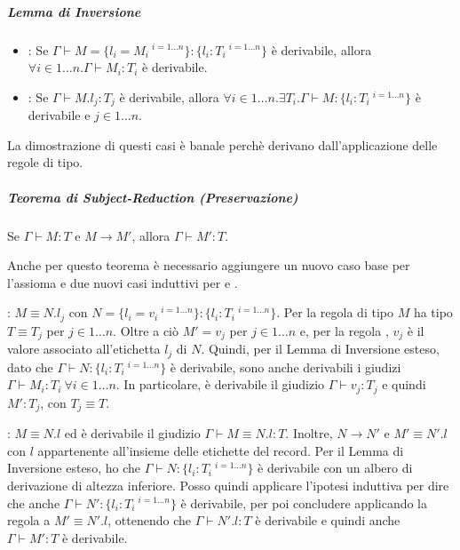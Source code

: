 \subparagraph{Lemma di Inversione}

\begin{itemize}
	\item {}: Se $\Gamma \vdash M = \{ l_i = M_i \:^{i = 1 \ldots n} \} : \{ l_i : T_i \:^{i = 1 \ldots n} \}$ \`e derivabile, allora $\forall i \in 1 \ldots n. \Gamma \vdash M_i : T_i$ \`e derivabile.
	\item {}: Se $\Gamma \vdash M.l_j : T_j$ \`e derivabile, allora $\forall i \in 1\ldots n.\exists T_i. \Gamma \vdash M :  \{ l_i : T_i \:^{i = 1 \ldots n} \}$ \`e derivabile e $j \in 1 \ldots n$.
\end{itemize}

\noindent La dimostrazione di questi casi \`e banale perch\`e derivano dall'applicazione delle regole di tipo.


\subparagraph{Teorema di Subject-Reduction (Preservazione)}

\begin{centering}
	Se $\Gamma \vdash M : T$ e $M \to M'$, allora $\Gamma \vdash M':T$.
\end{centering}

\noindent Anche per questo teorema \`e necessario aggiungere un nuovo caso base per l'assioma  e due nuovi casi induttivi per  e .

\vspace{10px}

: $M \equiv N.l_j$ con $N = \{ l_i = v_i \:^{i = 1 \ldots n} \} : \{ l_i : T_i \:^{i = 1 \ldots n} \}$.
Per la regola di tipo  $M$ ha tipo $T \equiv T_j$ per $j \in 1\ldots n$.
Oltre a ci\`o $M' = v_j$ per $j \in 1\ldots n$ e, per la regola , $v_j$ \`e il valore associato all'etichetta $l_j$ di $N$. Quindi, per il Lemma di Inversione esteso, dato che $\Gamma \vdash N : \{ l_i : T_i \:^{i = 1 \ldots n} \}$ \`e derivabile, sono anche derivabili i giudizi $\Gamma \vdash M_i :T_i \: \forall i \in 1 \ldots n$.
In particolare, \`e derivabile il giudizio $\Gamma \vdash v_j : T_j$ e quindi $M' : T_j$, con $T_j \equiv T$.

\vspace{10px}

: $M \equiv N.l$ ed \`e derivabile il giudizio $\Gamma \vdash M \equiv N.l : T $. Inoltre, $ N \to N'$ e $M' \equiv N'.l$ con $l$ appartenente all'insieme delle etichette del record. 
Per il Lemma di Inversione esteso, ho che $\Gamma \vdash N : \{ l_i : T_i \:^{i = 1 \ldots n} \}$ \`e derivabile con un albero di derivazione di altezza inferiore.
Posso quindi applicare l'ipotesi induttiva per dire che anche $\Gamma \vdash N' : \{ l_i : T_i \:^{i = 1 \ldots n} \}$ \`e derivabile, per poi concludere applicando la regola  a $M' \equiv N'.l$, ottenendo che $\Gamma \vdash N'.l : T$ \`e derivabile e quindi anche $\Gamma \vdash M':T$ \`e derivabile.

